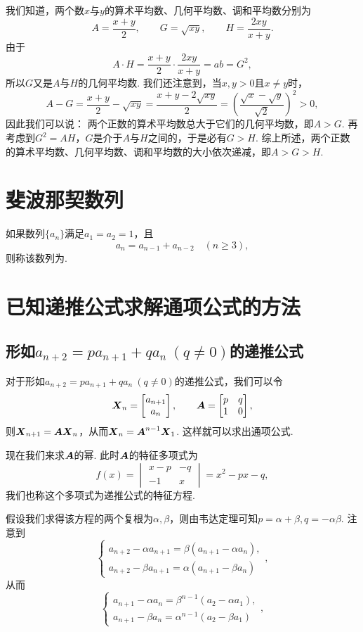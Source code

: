 我们知道，两个数\(x\)与\(y\)的算术平均数、几何平均数、调和平均数分别为\[
    A = \frac{x+y}{2}, \qquad
    G = \sqrt{xy}, \qquad
    H = \frac{2xy}{x+y}.
\]
由于\[
    A \cdot H = \frac{x+y}{2} \cdot \frac{2xy}{x+y}
    = ab = G^2,
\]
所以\(G\)又是\(A\)与\(H\)的几何平均数.
我们还注意到，当\(x,y>0\)且\(x \neq y\)时，\[
    A - G = \frac{x+y}{2} - \sqrt{xy}
    = \frac{x+y-2\sqrt{xy}}{2}
    = \left(\frac{\sqrt{x}-\sqrt{y}}{\sqrt{2}}\right)^2
    > 0,
\]
因此我们可以说：
两个正数的算术平均数总大于它们的几何平均数，即\(A > G\).
再考虑到\(G^2 = A H\)，\(G\)是介于\(A\)与\(H\)之间的，于是必有\(G > H\).
综上所述，两个正数的算术平均数、几何平均数、调和平均数的大小依次递减，即\(A > G > H\).

\section{斐波那契数列}
如果数列\(\{a_n\}\)满足\(a_1=a_2=1\)，且\[
a_n = a_{n-1} + a_{n-2} \quad(n\geq3),
\]则称该数列为.

\section{已知递推公式求解通项公式的方法}
\subsection{\texorpdfstring{形如\(a_{n+2}=p a_{n+1} + q a_n\ (q\neq0)\)的递推公式}{第一类递推公式}}
对于形如\(a_{n+2}=p a_{n+1} + q a_n\ (q\neq0)\)的递推公式，我们可以令\[
\boldsymbol{X}_n = \begin{bmatrix}
a_{n+1} \\
a_n
\end{bmatrix},
\qquad
\boldsymbol{A} = \begin{bmatrix}
p & q \\
1 & 0
\end{bmatrix},
\]则\(\boldsymbol{X}_{n+1} = \boldsymbol{A} \boldsymbol{X}_n\)，从而\(\boldsymbol{X}_n = \boldsymbol{A}^{n-1} \boldsymbol{X}_1\).
这样就可以求出通项公式.

现在我们来求\(\boldsymbol{A}\)的幂.
此时\(\boldsymbol{A}\)的特征多项式为\[
f(x) = \begin{vmatrix}
x-p & -q \\
-1 & x
\end{vmatrix} = x^2 - px - q,
\]我们也称这个多项式为递推公式的特征方程.

假设我们求得该方程的两个复根为\(\alpha,\beta\)，则由韦达定理可知\(p=\alpha+\beta, q=-\alpha\beta\).
注意到\[
\left\{ \begin{array}{l}
a_{n+2} - \alpha a_{n+1} = \beta(a_{n+1}-\alpha a_n), \\
a_{n+2} - \beta a_{n+1} = \alpha(a_{n+1}-\beta a_n)
\end{array} \right.,
\]从而\[
\left\{ \begin{array}{l}
a_{n+1} - \alpha a_n = \beta^{n-1} (a_2 - \alpha a_1), \\
a_{n+1} - \beta a_n = \alpha^{n-1} (a_2 - \beta a_1)
\end{array} \right.,
\]


